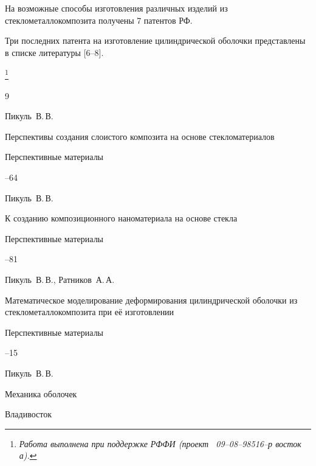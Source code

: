 На возможные способы изготовления различных изделий из стеклометаллокомпозита получены 7 патентов РФ. 

Три последних патента на изготовление цилиндрической оболочки представлены в списке литературы [6--8].





\thanks{\it Работа выполнена при поддержке РФФИ \rm (\it проект \rm \No~09--08--98516--р восток а).}



\vspace{-2mm}



\begin{thebibliography}{9}


\by Пикуль~В.\,В. 

\paper Перспективы создания слоистого композита на основе стекломатериалов 

\jour Перспективные материалы



--64




\by Пикуль~В.\,В. 

\paper К созданию композиционного наноматериала на основе стекла 

\jour Перспективные материалы



--81




\by Пикуль~В.\,В., Ратников~А.\,А.

\paper Математическое моделирование деформирования цилиндрической оболочки из стеклометаллокомпозита при её изготовлении 

\jour Перспективные материалы



--15






\by Пикуль~В.\,В. 

\book Механика оболочек 

\publaddr Владивосток


\end{thebibliography}
